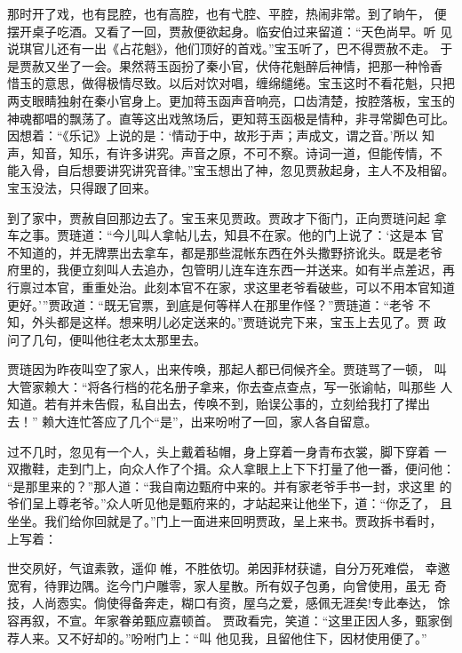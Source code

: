 那时开了戏，也有昆腔，也有高腔，也有弋腔、平腔，热闹非常。到了晌午，
便摆开桌子吃酒。又看了一回，贾赦便欲起身。临安伯过来留道：“天色尚早。听
见说琪官儿还有一出《占花魁》，他们顶好的首戏。”宝玉听了，巴不得贾赦不走。
于是贾赦又坐了一会。果然蒋玉函扮了秦小官，伏侍花魁醉后神情，把那一种怜香
惜玉的意思，做得极情尽致。以后对饮对唱，缠绵缱绻。宝玉这时不看花魁，只把
两支眼睛独射在秦小官身上。更加蒋玉函声音响亮，口齿清楚，按腔落板，宝玉的
神魂都唱的飘荡了。直等这出戏煞场后，更知蒋玉函极是情种，非寻常脚色可比。
因想着：“《乐记》上说的是：‘情动于中，故形于声；声成文，谓之音。’所以
知声，知音，知乐，有许多讲究。声音之原，不可不察。诗词一道，但能传情，不
能入骨，自后想要讲究讲究音律。”宝玉想出了神，忽见贾赦起身，主人不及相留。
宝玉没法，只得跟了回来。

到了家中，贾赦自回那边去了。宝玉来见贾政。贾政才下衙门，正向贾琏问起
拿车之事。贾琏道：“今儿叫人拿帖儿去，知县不在家。他的门上说了：‘这是本
官不知道的，并无牌票出去拿车，都是那些混帐东西在外头撒野挤讹头。既是老爷
府里的，我便立刻叫人去追办，包管明儿连车连东西一并送来。如有半点差迟，再
行禀过本官，重重处治。此刻本官不在家，求这里老爷看破些，可以不用本官知道
更好。’”贾政道：“既无官票，到底是何等样人在那里作怪？”贾琏道：“老爷
不知，外头都是这样。想来明儿必定送来的。”贾琏说完下来，宝玉上去见了。贾
政问了几句，便叫他往老太太那里去。

贾琏因为昨夜叫空了家人，出来传唤，那起人都已伺候齐全。贾琏骂了一顿，
叫大管家赖大：“将各行档的花名册子拿来，你去查点查点，写一张谕帖，叫那些
人知道。若有并未告假，私自出去，传唤不到，贻误公事的，立刻给我打了撵出去！”
赖大连忙答应了几个“是”，出来吩咐了一回，家人各自留意。

过不几时，忽见有一个人，头上戴着毡帽，身上穿着一身青布衣裳，脚下穿着
一双撒鞋，走到门上，向众人作了个揖。众人拿眼上上下下打量了他一番，便问他：
“是那里来的？”那人道：“我自南边甄府中来的。并有家老爷手书一封，求这里
的爷们呈上尊老爷。”众人听见他是甄府来的，才站起来让他坐下，道：“你乏了，
且坐坐。我们给你回就是了。”门上一面进来回明贾政，呈上来书。贾政拆书看时，
上写着：

世交夙好，气谊素敦，遥仰帷，不胜依切。弟因菲材获谴，自分万死难偿，
幸邀宽宥，待罪边隅。迄今门户雕零，家人星散。所有奴子包勇，向曾使用，虽无
奇技，人尚悫实。倘使得备奔走，糊口有资，屋乌之爱，感佩无涯矣!专此奉达，
馀容再叙，不宣。年家眷弟甄应嘉顿首。
贾政看完，笑道：“这里正因人多，甄家倒荐人来。又不好却的。”吩咐门上：“叫
他见我，且留他住下，因材使用便了。”

